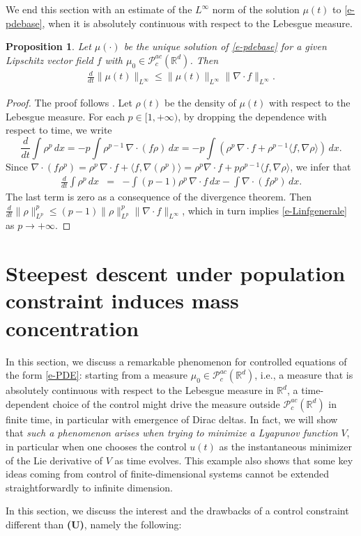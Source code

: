 \documentclass{article}
\newcommand{\R}{\mathbb{R}}
\newcommand{\Pac}{\mathcal{P}^{ac}_c(\R^{d})}
\newtheorem{prop}{Proposition}
\theoremstyle{definition}\newtheorem{remark}{Remark}
\newcommand{\bp}{\begin{prop}}
\newcommand{\ep}{\end{prop}}
\newcommand{\Pt}[1]{\left( #1 \right)}
\newcommand{\Pa}[1]{\langle #1 \rangle}
\newcommand{\bqn}{\begin{eqnarray}}
\newcommand{\eqnn}{\nonumber\end{eqnarray}}
\newcommand{\eqnl}[1]{\label{#1}\end{eqnarray}}
\newcommand{\bproof}{\begin{proof}}
\newcommand{\eproof}{\end{proof}}
\renewcommand{\r}[1]{\eqref{#1}}
\begin{document}
We end this section with an estimate of the $L^\infty$ norm of the solution $\mu(t)$ to \r{e-pdebase}, when it is absolutely continuous with respect to the Lebesgue measure.

\bp \label{p-Linfgenerale}
Let $\mu(\cdot)$ be the unique solution of \r{e-pdebase} for a given Lipschitz vector field $f$ with $\mu_0\in\Pac$. Then
\bqn
\frac{d}{dt}\|\mu(t)\|_{L^\infty}\leq \|\mu(t)\|_{L^\infty}\|\nabla\cdot f\|_{L^\infty}.
\eqnl{e-Linfgenerale}
\ep

\bproof 
The proof follows \cite[Proposition~3.1]{ha-tad}. Let $\rho(t)$ be the density of $\mu(t)$ with respect to the Lebesgue measure. For each $p\in[1,+\infty)$, by dropping the dependence with respect to time, we write 
$$
\frac{d}{dt}\int \rho^p\,dx=-p\int \rho^{p-1}\,\nabla\cdot (f\rho)\,dx=-p\int \Pt{ \rho^p \,\nabla\cdot f +\rho^{p-1} \Pa{f,\nabla \rho}}\,dx.
$$
Since $\nabla\cdot(f \rho^p)=\rho^p\,  \nabla\cdot f+\Pa{f,\nabla (\rho^p)}=\rho^p \nabla\cdot f+ p \rho^{p-1} \Pa{f,\nabla \rho}$, we infer that
\bqn
\frac{d}{dt}\int \rho^p\,dx&=&-\int(p-1)\rho^p \,\nabla\cdot f\,dx-\int \nabla\cdot(f\rho^p)\,dx.
\eqnn
The last term is zero as a consequence of the divergence theorem. Then 
$\frac{d}{dt}\|\rho\|_{L^p}^p\leq (p-1)\|\rho\|_{L^p}^p \|\nabla\cdot f\|_{L^\infty}$,
which in turn implies \r{e-Linfgenerale} as $p \to +\infty$.
\eproof



\section{Steepest descent under population constraint induces mass concentration}
\label{s-concentration}
In this section, we discuss a remarkable phenomenon for controlled equations of the form \r{e-PDE}: starting from a measure $\mu_0\in\Pac$, i.e., a measure that is absolutely continuous with respect to the Lebesgue measure in $\R^d$, a time-dependent choice of the control might drive the measure outside $\Pac$ in finite time, in particular with emergence of Dirac deltas. In fact, we will show that {\em such a phenomenon arises when trying to minimize a Lyapunov function} $V$, in particular when one chooses the control $u(t)$ as the instantaneous minimizer of  the Lie derivative of $V$ as time evolves. This example also shows that some key ideas coming from control of finite-dimensional systems cannot be extended straightforwardly to infinite dimension.

In this section, we discuss the interest and the drawbacks of a control constraint different than {\bf (U)}, namely the following:
\end{document}
